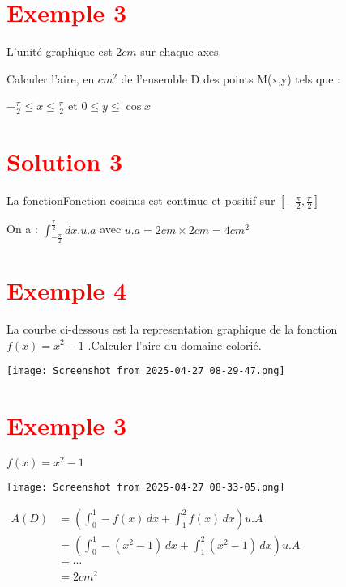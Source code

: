 \documentclass[12pt]{article}
\begin{document}
\section*{\textbf{\textcolor{red}{Exemple 3}}}

L'unité graphique est $2cm$ sur chaque axes.

Calculer l'aire, en $cm^{2}$ de l'ensemble D des points M(x,y) tels que :

 \(-\frac{\pi}{2}\leq x \leq \frac{\pi}{2} \) et \( 0\leq y \leq \cos x \)

\section*{\textbf{\textcolor{red}{Solution 3}}}

La fonctionFonction cosinus est continue et positif sur \( \left[ -\frac{\pi}{2}, \frac{\pi}{2}\right]  \)

On a : $\int_{-\frac{\pi}{2}}^{\frac{\pi}{2}}dx.u.a$ avec $u.a = 2cm \times 2cm=4cm^{2}$

\section*{\textbf{\textcolor{red}{Exemple 4}}}

La courbe ci-dessous est la representation graphique de la fonction $f(x)=x^{2}-1$ .Calculer l'aire du domaine colorié.

\begin{center}
   \texttt{[image: Screenshot from 2025-04-27 08-29-47.png]}
\end{center}  

\section*{\textbf{\textcolor{red}{Exemple 3}}}

$f(x)=x^{2}-1$


\begin{center}
   \texttt{[image: Screenshot from 2025-04-27 08-33-05.png]}
\end{center}
\(
\begin{aligned}
A(D) &= \left( \int_0^1 -f(x) \, dx + \int_1^2 f(x) \, dx \right) u.A\\
		 &= \left( \int_0^1 -(x^{2}-1) \, dx + \int_1^2 (x^{2}-1) \, dx \right) u.A\\
		 &=\cdots\\
		 &=2cm^{2}
\end{aligned}
\)  
\end{document}
